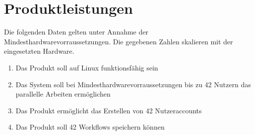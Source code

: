 \chapter{Produktleistungen}
Die folgenden Daten gelten unter Annahme der Mindesthardwarevorraussetzungen. Die
gegebenen Zahlen skalieren mit der eingesetzten Hardware.

\renewcommand{\labelenumi}{/PL\arabic{enumi}0/}
\begin{enumerate}
    \setlength\itemsep{-1em}
    \item Das Produkt soll auf Linux funktionsfähig sein
    \item Das System soll bei Mindesthardwarevorraussetzungen bis zu 42 Nutzern das parallelle Arbeiten ermöglichen %
    \item Das Produkt ermöglicht das Erstellen von 42 Nutzeraccounts %
    \item Das Produkt soll 42 Workflows speichern können %
    
\end{enumerate}